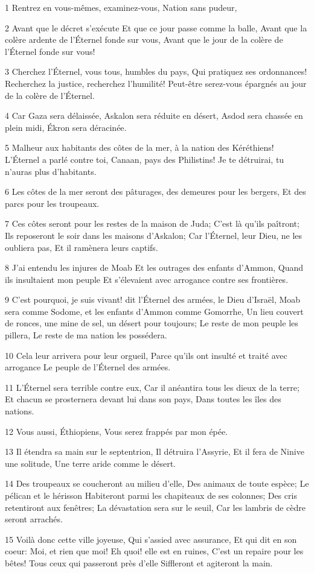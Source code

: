 \par 1 Rentrez en vous-mêmes, examinez-vous, Nation sans pudeur,
\par 2 Avant que le décret s'exécute Et que ce jour passe comme la balle, Avant que la colère ardente de l'Éternel fonde sur vous, Avant que le jour de la colère de l'Éternel fonde sur vous!
\par 3 Cherchez l'Éternel, vous tous, humbles du pays, Qui pratiquez ses ordonnances! Recherchez la justice, recherchez l'humilité! Peut-être serez-vous épargnés au jour de la colère de l'Éternel.
\par 4 Car Gaza sera délaissée, Askalon sera réduite en désert, Asdod sera chassée en plein midi, Ékron sera déracinée.
\par 5 Malheur aux habitants des côtes de la mer, à la nation des Kéréthiens! L'Éternel a parlé contre toi, Canaan, pays des Philistins! Je te détruirai, tu n'auras plus d'habitants.
\par 6 Les côtes de la mer seront des pâturages, des demeures pour les bergers, Et des parcs pour les troupeaux.
\par 7 Ces côtes seront pour les restes de la maison de Juda; C'est là qu'ils paîtront; Ils reposeront le soir dans les maisons d'Askalon; Car l'Éternel, leur Dieu, ne les oubliera pas, Et il ramènera leurs captifs.
\par 8 J'ai entendu les injures de Moab Et les outrages des enfants d'Ammon, Quand ils insultaient mon peuple Et s'élevaient avec arrogance contre ses frontières.
\par 9 C'est pourquoi, je suis vivant! dit l'Éternel des armées, le Dieu d'Israël, Moab sera comme Sodome, et les enfants d'Ammon comme Gomorrhe, Un lieu couvert de ronces, une mine de sel, un désert pour toujours; Le reste de mon peuple les pillera, Le reste de ma nation les possédera.
\par 10 Cela leur arrivera pour leur orgueil, Parce qu'ils ont insulté et traité avec arrogance Le peuple de l'Éternel des armées.
\par 11 L'Éternel sera terrible contre eux, Car il anéantira tous les dieux de la terre; Et chacun se prosternera devant lui dans son pays, Dans toutes les îles des nations.
\par 12 Vous aussi, Éthiopiens, Vous serez frappés par mon épée.
\par 13 Il étendra sa main sur le septentrion, Il détruira l'Assyrie, Et il fera de Ninive une solitude, Une terre aride comme le désert.
\par 14 Des troupeaux se coucheront au milieu d'elle, Des animaux de toute espèce; Le pélican et le hérisson Habiteront parmi les chapiteaux de ses colonnes; Des cris retentiront aux fenêtres; La dévastation sera sur le seuil, Car les lambris de cèdre seront arrachés.
\par 15 Voilà donc cette ville joyeuse, Qui s'assied avec assurance, Et qui dit en son coeur: Moi, et rien que moi! Eh quoi! elle est en ruines, C'est un repaire pour les bêtes! Tous ceux qui passeront près d'elle Siffleront et agiteront la main.


